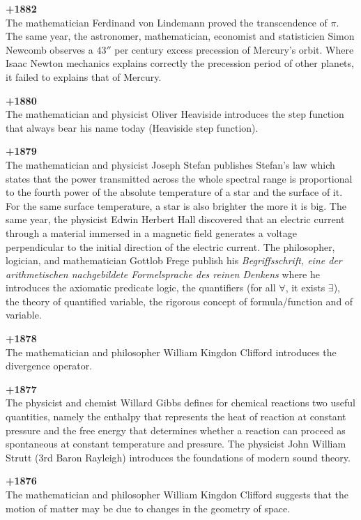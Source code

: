 \textbf{+1882}\\
The mathematician Ferdinand von Lindemann proved the transcendence of $\pi$. The same year, the astronomer, mathematician, economist and statisticien Simon Newcomb observes a $43''$ per century excess precession of Mercury's orbit. Where Isaac Newton mechanics explains correctly the precession period of other planets, it failed to explains that of Mercury.

\textbf{+1880}\\
The mathematician and physicist Oliver Heaviside introduces the step function that always bear his name today (Heaviside step function).

\textbf{+1879}\\
The mathematician and physicist Joseph Stefan publishes Stefan's law which states that the power transmitted across the whole spectral range is proportional to the fourth power of the absolute temperature of a star and the surface of it. For the same surface temperature, a star is also brighter the more it is big. The same year, the physicist Edwin Herbert Hall discovered that an electric current through a material immersed in a magnetic field generates a voltage perpendicular to the initial direction of the electric current. The philosopher, logician, and mathematician Gottlob Frege publish his \textit{Begriffsschrift, eine der arithmetischen nachgebildete Formelsprache des reinen Denkens} where he introduces the axiomatic predicate logic, the quantifiers (for all $\forall$, it exists $\exists$), the theory of quantified variable, the rigorous concept of formula/function and of variable.

\textbf{+1878}\\
The mathematician and philosopher William Kingdon Clifford introduces the divergence operator.

\textbf{+1877}\\
The physicist and chemist Willard Gibbs defines for chemical reactions two useful quantities, namely the enthalpy that represents the heat of reaction at constant pressure and the free energy that determines whether a reaction can proceed as spontaneous at constant temperature and pressure. The physicist John William Strutt (3rd Baron Rayleigh) introduces the foundations of modern sound theory. 

\textbf{+1876}\\
The mathematician and philosopher William Kingdon Clifford suggests that the motion of matter may be due to changes in the geometry of space.

